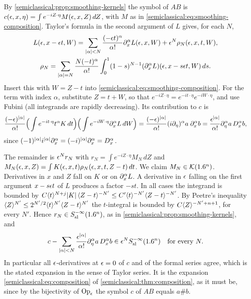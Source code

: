 \subsection*{}
By \cref{semiclassical:prop:smoothing-kernels} the symbol of $AB$ is
$c(\epsilon,x,\eta)=\int e^{-iZ\cdot\eta}M(\epsilon,x,Z)\,dZ$, with $M$ as in
\eqref{semiclassical:eq:smoothing-composition}. Taylor's formula in the second argument of $L$
gives, for each $N$,
\begin{gather*}
L(\epsilon,x-\epsilon t,W)=\sum_{\lvert \alpha\rvert<N}\frac{(-\epsilon t)^\alpha}{\alpha!}\partial^\alpha_xL(\epsilon,x,W)+\epsilon^N\rho_N(\epsilon,x,t,W),\\
\rho_N=\sum_{\lvert \alpha\rvert=N}\frac{N(-t)^\alpha}{\alpha!}\int_0^1(1-s)^{N-1}(\partial^\alpha_xL)(\epsilon,x-s\epsilon t,W)\,ds .
\end{gather*}
Insert this with $W=Z-t$ into \eqref{semiclassical:eq:smoothing-composition}. For the term
with index $\alpha$, substitute $Z=t+W$, so that $e^{-iZ\cdot\eta}=e^{-it\cdot\eta}e^{-iW\cdot\eta}$, and use
Fubini (all integrands are rapidly decreasing). Its contribution to $c$ is
\begin{equation*}
\frac{(-\epsilon)^{\lvert \alpha\rvert}}{\alpha!}\Big(\int e^{-it\cdot\eta}t^\alpha K\,dt\Big)\Big(\int e^{-iW\cdot\eta}\partial^\alpha_xL\,dW\Big)
=\frac{(-\epsilon)^{\lvert \alpha\rvert}}{\alpha!}(i\partial_\eta)^\alpha a\;\partial^\alpha_xb
=\frac{\epsilon^{\lvert \alpha\rvert}}{\alpha!}\partial^\alpha_\eta a\,D^\alpha_xb,
\end{equation*}
since $(-1)^{\lvert \alpha\rvert}i^{\lvert \alpha\rvert}\partial^\alpha_x=(-i)^{\lvert \alpha\rvert}\partial^\alpha_x=D^\alpha_x$.

The remainder is $\epsilon^Nr_N$ with $r_N=\int e^{-iZ\cdot\eta}M_N\,dZ$ and
$M_N(\epsilon,x,Z)=\int K(\epsilon,x,t)\rho_N(\epsilon,x,t,Z-t)\,dt$. We claim $M_N\in\mathcal K(1.6^n)$. Derivatives in
$x$ and $Z$ fall on $K$ or on $\partial^\alpha_xL$. A derivative in $\epsilon$ falling on the first argument
$x-s\epsilon t$ of $L$ produces a factor $-st$. In all cases the integrand is bounded by
$C\langle t\rangle^{N+j}\lvert K\rvert\,\langle Z-t\rangle^{-N'}\le C'\langle t\rangle^{-N'}\langle Z-t\rangle^{-N'}$. By Peetre's inequality
$\langle Z\rangle^{N'}\le2^{N'/2}\langle t\rangle^{N'}\langle Z-t\rangle^{N'}$ the $t$-integral is bounded by $C\langle Z\rangle^{-N'+n+1}$, for
every $N'$. Hence $r_N\in S^{-\infty}_{\mathrm{sl}}(1.6^n)$, as in \cref{semiclassical:prop:smoothing-kernels}, and
\begin{equation*}
c-\sum_{\lvert \alpha\rvert<N}\frac{\epsilon^{\lvert \alpha\rvert}}{\alpha!}\partial^\alpha_\eta a\,D^\alpha_xb\in\epsilon^NS^{-\infty}_{\mathrm{sl}}(1.6^n)\quad\text{for every }N .
\end{equation*}
In particular all $\epsilon$-derivatives at $\epsilon=0$ of $c$ and of the formal series agree, which is
the stated expansion in the sense of Taylor series. It is the expansion
\eqref{semiclassical:eq:composition} of \cref{semiclassical:thm:composition}, as it must be,
since by the bijectivity of $\operatorname{Op}_\epsilon$ the symbol $c$ of $AB$ equals $a\#b$.

